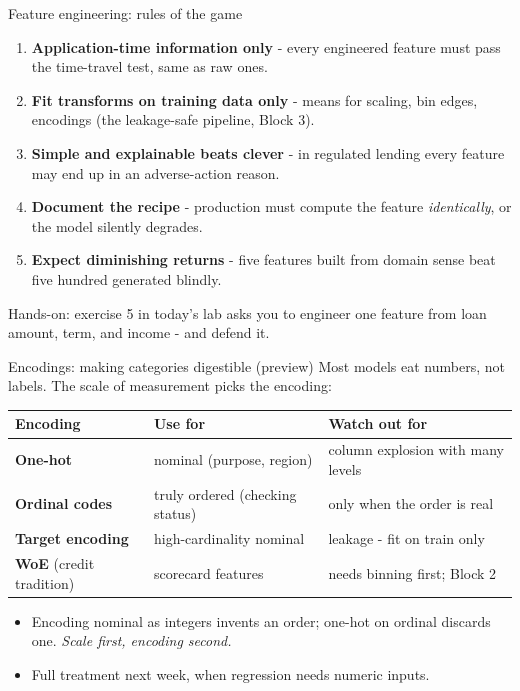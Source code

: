 \documentclass[10pt,aspectratio=169]{beamer}
\begin{document}
\begin{frame}{Feature engineering: rules of the game}
  \begin{enumerate}
    \item \textbf{Application-time information only} - every engineered
          feature must pass the \alert{time-travel test}, same as raw ones.
    \item \textbf{Fit transforms on training data only} - means for scaling,
          bin edges, encodings (the leakage-safe pipeline, Block 3).
    \item \textbf{Simple and explainable beats clever} - in regulated
          lending every feature may end up in an adverse-action reason.
    \item \textbf{Document the recipe} - production must compute the feature
          \emph{identically}, or the model silently degrades.
    \item \textbf{Expect diminishing returns} - five features built from
          domain sense beat five hundred generated blindly.
  \end{enumerate}
  \vspace{0.5em}
  \begin{center}\small
    Hands-on: exercise 5 in today's lab asks you to engineer one feature from
    loan amount, term, and income - and defend it.
  \end{center}
\end{frame}

\begin{frame}{Encodings: making categories digestible (preview)}
  Most models eat numbers, not labels. The scale of measurement picks the encoding:
  \vspace{0.3em}
  \footnotesize
  \begin{center}
  \begin{tabular}{@{}lll@{}}
    \toprule
    Encoding & Use for & Watch out for \\
    \midrule
    \textbf{One-hot} & nominal (purpose, region) & column explosion with many levels \\
    \textbf{Ordinal codes} & truly ordered (checking status) & only when the order is real \\
    \textbf{Target encoding} & high-cardinality nominal & \alert{leakage} - fit on train only \\
    \textbf{WoE} (credit tradition) & scorecard features & needs binning first; Block 2 \\
    \bottomrule
  \end{tabular}
  \end{center}
  \small
  \vspace{0.5em}
  \begin{itemize}\small
    \item Encoding nominal as integers invents an order; one-hot on ordinal
          discards one. \emph{Scale first, encoding second.}
    \item Full treatment next week, when regression needs numeric inputs.
  \end{itemize}
\end{frame}
\end{document}
